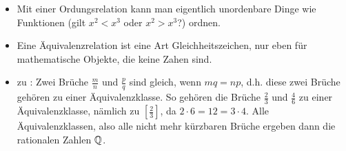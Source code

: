 \begin{*anmerkung}
	\begin{itemize}
		\item Mit einer Ordungsrelation kann man eigentlich unordenbare Dinge wie Funktionen (gilt $x^2 < x^3$ oder $x^2 > x^3$?) ordnen.
		\item Eine Äquivalenzrelation ist eine Art Gleichheitszeichen, nur eben für mathematische Objekte, die 
		keine Zahen sind.
		\item zu : Zwei Brüche $\frac{m}{n}$ und $\frac p q$ 
		sind gleich, wenn $mq=np$, d.h. diese zwei Brüche gehören zu einer Äquivalenzklasse. So 
		gehören die Brüche $\frac 2 3$ und $\frac 4 6$ zu einer Äquivalenzklasse, nämlich zu $\left[ \frac 
		2 3\right]$, da $2\cdot 6=12=3\cdot 4$. Alle Äquivalenzklassen, also alle nicht mehr kürzbaren Brüche 
		ergeben dann die rationalen Zahlen $\mathbb{Q}$.
	\end{itemize}
\end{*anmerkung}


